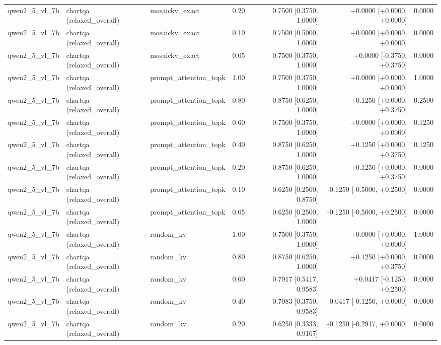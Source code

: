 \begin{longtable}{lllrrrr}
qwen2\_5\_vl\_7b & chartqa (relaxed\_overall) & mosaickv\_exact & 0.20 & 0.7500 [0.3750, 1.0000] & +0.0000 [+0.0000, +0.0000] & 0.0000 \\
qwen2\_5\_vl\_7b & chartqa (relaxed\_overall) & mosaickv\_exact & 0.10 & 0.7500 [0.5000, 1.0000] & +0.0000 [+0.0000, +0.0000] & 0.0000 \\
qwen2\_5\_vl\_7b & chartqa (relaxed\_overall) & mosaickv\_exact & 0.05 & 0.7500 [0.3750, 1.0000] & +0.0000 [-0.3750, +0.3750] & 0.0000 \\
qwen2\_5\_vl\_7b & chartqa (relaxed\_overall) & prompt\_attention\_topk & 1.00 & 0.7500 [0.3750, 1.0000] & +0.0000 [+0.0000, +0.0000] & 1.0000 \\
qwen2\_5\_vl\_7b & chartqa (relaxed\_overall) & prompt\_attention\_topk & 0.80 & 0.8750 [0.6250, 1.0000] & +0.1250 [+0.0000, +0.3750] & 0.2500 \\
qwen2\_5\_vl\_7b & chartqa (relaxed\_overall) & prompt\_attention\_topk & 0.60 & 0.7500 [0.3750, 1.0000] & +0.0000 [+0.0000, +0.0000] & 0.1250 \\
qwen2\_5\_vl\_7b & chartqa (relaxed\_overall) & prompt\_attention\_topk & 0.40 & 0.8750 [0.6250, 1.0000] & +0.1250 [+0.0000, +0.3750] & 0.1250 \\
qwen2\_5\_vl\_7b & chartqa (relaxed\_overall) & prompt\_attention\_topk & 0.20 & 0.8750 [0.6250, 1.0000] & +0.1250 [+0.0000, +0.3750] & 0.0000 \\
qwen2\_5\_vl\_7b & chartqa (relaxed\_overall) & prompt\_attention\_topk & 0.10 & 0.6250 [0.2500, 0.8750] & -0.1250 [-0.5000, +0.2500] & 0.0000 \\
qwen2\_5\_vl\_7b & chartqa (relaxed\_overall) & prompt\_attention\_topk & 0.05 & 0.6250 [0.2500, 1.0000] & -0.1250 [-0.5000, +0.2500] & 0.0000 \\
qwen2\_5\_vl\_7b & chartqa (relaxed\_overall) & random\_kv & 1.00 & 0.7500 [0.3750, 1.0000] & +0.0000 [+0.0000, +0.0000] & 1.0000 \\
qwen2\_5\_vl\_7b & chartqa (relaxed\_overall) & random\_kv & 0.80 & 0.8750 [0.6250, 1.0000] & +0.1250 [+0.0000, +0.3750] & 0.0000 \\
qwen2\_5\_vl\_7b & chartqa (relaxed\_overall) & random\_kv & 0.60 & 0.7917 [0.5417, 0.9583] & +0.0417 [-0.1250, +0.2500] & 0.0000 \\
qwen2\_5\_vl\_7b & chartqa (relaxed\_overall) & random\_kv & 0.40 & 0.7083 [0.3750, 0.9583] & -0.0417 [-0.1250, +0.0000] & 0.0000 \\
qwen2\_5\_vl\_7b & chartqa (relaxed\_overall) & random\_kv & 0.20 & 0.6250 [0.3333, 0.9167] & -0.1250 [-0.2917, +0.0000] & 0.0000 \\

\end{longtable}
